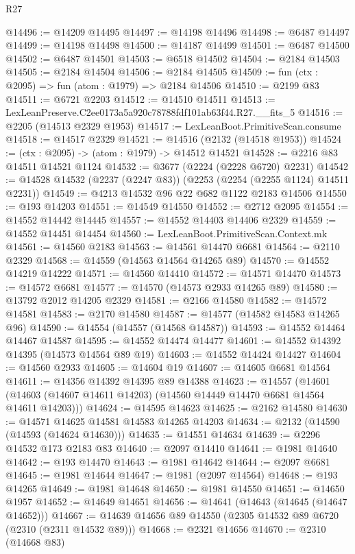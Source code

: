 \begin{lexlean}{R27}
\begin{coremodule}
@14496 := @14209 @14495
@14497 := @14198 @14496
@14498 := @6487 @14497
@14499 := @14198 @14498
@14500 := @14187 @14499
@14501 := @6487 @14500
@14502 := @6487 @14501
@14503 := @6518 @14502
@14504 := @2184 @14503
@14505 := @2184 @14504
@14506 := @2184 @14505
@14509 := fun (ctx : @2095) => fun (atom : @1979) => @2184 @14506
@14510 := @2199 @83
@14511 := @6721 @2203
@14512 := @14510 @14511
@14513 := LexLeanPreserve.C2ee0173a5a920c78788fdf101ab63f44.R27.__fits_5
@14516 := @2205 (@14513 @2329 @1953)
@14517 := LexLeanBoot.PrimitiveScan.consume
@14518 := @14517 @2329
@14521 := @14516 (@2132 (@14518 @1953))
@14524 := (ctx : @2095) -> (atom : @1979) -> @14512 @14521
@14528 := @2216 @83 @14511 @14521 @1124
@14532 := @3677 (@2224 (@2228 @6720) @2231)
@14542 := @14528 @14532 (@2237 (@2247 @83)) (@2253 (@2254 (@2255 @1124) @14511 @2231))
@14549 := @4213 @14532 @96 @22 @682 @1122 @2183 @14506
@14550 := @193 @14203
@14551 := @14549 @14550
@14552 := @2712 @2095
@14554 := @14552 @14442 @14445
@14557 := @14552 @14403 @14406 @2329
@14559 := @14552 @14451 @14454
@14560 := LexLeanBoot.PrimitiveScan.Context.mk
@14561 := @14560 @2183
@14563 := @14561 @14470 @6681
@14564 := @2110 @2329
@14568 := @14559 (@14563 @14564 @14265 @89)
@14570 := @14552 @14219 @14222
@14571 := @14560 @14410
@14572 := @14571 @14470
@14573 := @14572 @6681
@14577 := @14570 (@14573 @2933 @14265 @89)
@14580 := @13792 @2012 @14205 @2329
@14581 := @2166 @14580
@14582 := @14572 @14581
@14583 := @2170 @14580
@14587 := @14577 (@14582 @14583 @14265 @96)
@14590 := @14554 (@14557 (@14568 @14587))
@14593 := @14552 @14464 @14467 @14587
@14595 := @14552 @14474 @14477
@14601 := @14552 @14392 @14395 (@14573 @14564 @89 @19)
@14603 := @14552 @14424 @14427
@14604 := @14560 @2933
@14605 := @14604 @19
@14607 := @14605 @6681 @14564
@14611 := @14356 @14392 @14395 @89 @14388
@14623 := @14557
    (@14601 (@14603 (@14607 @14611 @14203) (@14560 @14449 @14470 @6681 @14564 @14611 @14203)))
@14624 := @14595 @14623
@14625 := @2162 @14580
@14630 := @14571 @14625 @14581 @14583 @14265 @14203
@14634 := @2132 (@14590 (@14593 (@14624 @14630)))
@14635 := @14551 @14634
@14639 := @2296 @14532 @173 @2183 @83
@14640 := @2097 @14410
@14641 := @1981 @14640
@14642 := @193 @14470
@14643 := @1981 @14642
@14644 := @2097 @6681
@14645 := @1981 @14644
@14647 := @1981 (@2097 @14564)
@14648 := @193 @14265
@14649 := @1981 @14648
@14650 := @1981 @14550
@14651 := @14650 @1957
@14652 := @14649 @14651
@14656 := @14641 (@14643 (@14645 (@14647 @14652)))
@14667 := @14639 @14656 @89 @14550 (@2305 @14532 @89 @6720 (@2310 (@2311 @14532 @89)))
@14668 := @2321 @14656
@14670 := @2310 (@14668 @83)

\end{coremodule}
\end{lexlean}
